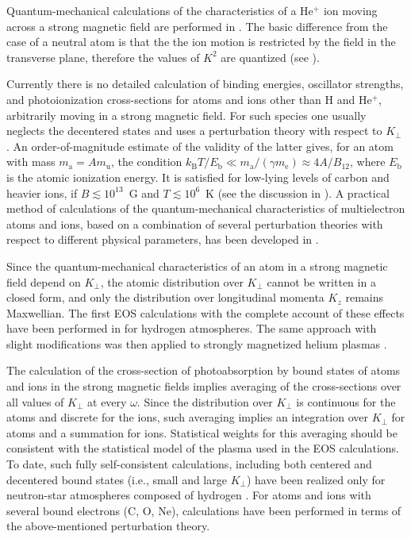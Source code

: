 \documentclass{pos1}
\newcommand{\kB}{k_\mathrm{B}}
\newcommand{\Kp}{K_\perp}
\newcommand{\mel}{m_\mathrm{e}}
\begin{document}
Quantum-mechanical calculations of the characteristics of a He$^+$ ion
moving across a strong magnetic field are performed in
\cite{BezchastnovPV98,PB05}. The basic difference from the case of a neutral
atom is that the the ion motion is restricted by the field in the
transverse plane, therefore the values of $K^2$ are quantized (see
\cite{JHY83}).

Currently there is no detailed calculation of binding energies,
oscillator strengths, and photoionization cross-sections for atoms and
ions other than H and He$^+$, arbitrarily moving in a strong magnetic
field. For such species one usually neglects the decentered states and
uses a perturbation theory with respect to $\Kp$ \cite{VB88,PM93}. An
order-of-magnitude estimate \cite{P14} of the validity of the latter
gives, for an atom with mass $m_\mathrm{a}=Am_\mathrm{u}$, the
condition $\kB T/E_\mathrm{b}\ll m_\mathrm{a}/(\gamma
\mel)\approx4A/B_{12}$, where $E_\mathrm{b}$ is the atomic ionization
energy. It is satisfied for low-lying levels of carbon and heavier
ions, if $B\lesssim10^{13}$~G and $T\lesssim10^6$~K (see the
discussion in \cite{P14}). A practical method of calculations of the
quantum-mechanical characteristics of multielectron atoms and ions,
based on a combination of several perturbation theories with respect
to different physical parameters, has been developed in
\cite{MoriHailey02}.

Since the quantum-mechanical characteristics of an atom in a strong
magnetic field depend on $K_\perp$, the atomic distribution over
$K_\perp$ cannot be written in a closed form, and only the
distribution over longitudinal momenta $K_z$ remains Maxwellian. The
first EOS calculations with the complete account of these effects have
been performed in \cite{PCS99} for hydrogen atmospheres. The same
approach with slight modifications was then applied to strongly
magnetized helium plasmas \cite{MoriHeyl}.

The calculation of the cross-section of photoabsorption by
bound states of atoms and ions in the strong magnetic fields implies
averaging of the cross-sections over all
values of $K_\perp$ at every $\omega$. Since the distribution over
$K_\perp$ is continuous for the atoms and  discrete for the ions, such
averaging implies an integration over $K_\perp$ for atoms and a
summation for ions. Statistical weights for this averaging should be
consistent with the statistical model of the plasma used in the EOS
calculations. To date, such fully self-consistent calculations,
including both centered and decentered bound states (i.e., small and
large $K_\perp$) have been realized only for neutron-star atmospheres
composed of hydrogen \cite{PC03,PC04,PCH14}. For atoms and ions with
several bound electrons (C, O, Ne), calculations have been performed
\cite{MoriHailey06,MoriHo} in terms of the above-mentioned
perturbation theory.
\end{document}

